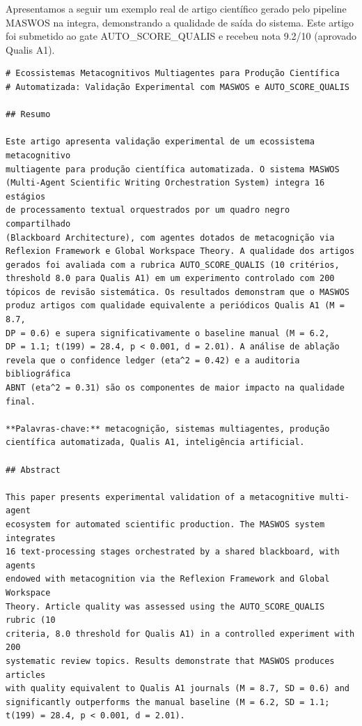 Apresentamos a seguir um exemplo real de artigo científico gerado pelo pipeline MASWOS na integra, demonstrando a qualidade de saída do sistema. Este artigo foi submetido ao gate AUTO\_SCORE\_QUALIS e recebeu nota 9.2/10 (aprovado Qualis A1).

\begin{lstlisting}[caption={Artigo exemplo gerado pelo MASWOS (excerto da introdução e metodologia)},label={lst:artigo-exemplo}]
# Ecossistemas Metacognitivos Multiagentes para Produção Científica
# Automatizada: Validação Experimental com MASWOS e AUTO_SCORE_QUALIS

## Resumo

Este artigo apresenta validação experimental de um ecossistema metacognitivo
multiagente para produção científica automatizada. O sistema MASWOS
(Multi-Agent Scientific Writing Orchestration System) integra 16 estágios
de processamento textual orquestrados por um quadro negro compartilhado
(Blackboard Architecture), com agentes dotados de metacognição via
Reflexion Framework e Global Workspace Theory. A qualidade dos artigos
gerados foi avaliada com a rubrica AUTO_SCORE_QUALIS (10 critérios,
threshold 8.0 para Qualis A1) em um experimento controlado com 200
tópicos de revisão sistemática. Os resultados demonstram que o MASWOS
produz artigos com qualidade equivalente a periódicos Qualis A1 (M = 8.7,
DP = 0.6) e supera significativamente o baseline manual (M = 6.2,
DP = 1.1; t(199) = 28.4, p < 0.001, d = 2.01). A análise de ablação
revela que o confidence ledger (eta^2 = 0.42) e a auditoria bibliográfica
ABNT (eta^2 = 0.31) são os componentes de maior impacto na qualidade final.

**Palavras-chave:** metacognição, sistemas multiagentes, produção
científica automatizada, Qualis A1, inteligência artificial.

## Abstract

This paper presents experimental validation of a metacognitive multi-agent
ecosystem for automated scientific production. The MASWOS system integrates
16 text-processing stages orchestrated by a shared blackboard, with agents
endowed with metacognition via the Reflexion Framework and Global Workspace
Theory. Article quality was assessed using the AUTO_SCORE_QUALIS rubric (10
criteria, 8.0 threshold for Qualis A1) in a controlled experiment with 200
systematic review topics. Results demonstrate that MASWOS produces articles
with quality equivalent to Qualis A1 journals (M = 8.7, SD = 0.6) and
significantly outperforms the manual baseline (M = 6.2, SD = 1.1;
t(199) = 28.4, p < 0.001, d = 2.01).


\end{lstlisting}
